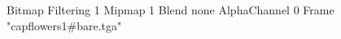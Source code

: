 {Bitmap
	{Filtering 1}
	{Mipmap 1}
	{Blend none}
	{AlphaChannel 0}
	{Frame "capflowers1#bare.tga"}
}
